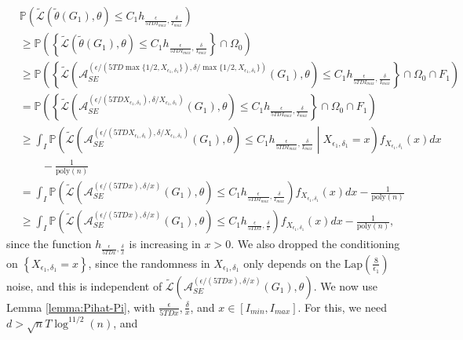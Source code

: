 \documentclass{article}
\begin{document}
\begin{align*}
&\mathbb{P}\left(\widetilde{\mathcal{L}}\left(\widetilde{\theta}(G_1), \theta\right) \leq C_1h_{\frac{\epsilon}{5TDI_{max}}, \frac{\delta}{I_{max}}}\right)\\
&\geq \mathbb{P}\left(\left\{\widetilde{\mathcal{L}}\left(\widetilde{\theta}(G_1), \theta\right) \leq C_1h_{\frac{\epsilon}{5TDI_{max}}, \frac{\delta}{I_{max}}}\right\} \cap \Omega_0\right)\\
&\geq \mathbb{P}\left(\left\{\widetilde{\mathcal{L}}\left(\mathcal{A}_{SE}^{(\epsilon/(5TD\max\{1/2, X_{\epsilon_1, \delta_1}\}), \delta/\max\{1/2, X_{\epsilon_1, \delta_1}\})}(G_1), \theta\right) \leq C_1h_{\frac{\epsilon}{5TDI_{max}}, \frac{\delta}{I_{max}}}\right\} \cap \Omega_0 \cap F_1\right)\\
&= \mathbb{P}\left(\left\{\widetilde{\mathcal{L}}\left(\mathcal{A}_{SE}^{(\epsilon/(5TD X_{\epsilon_1, \delta_1}), \delta/X_{\epsilon_1, \delta_1})}(G_1), \theta\right) \leq C_1h_{\frac{\epsilon}{5TDI_{max}}, \frac{\delta}{I_{max}}}\right\} \cap \Omega_0 \cap F_1\right)\\
&\geq \int_I\mathbb{P}\left(\widetilde{\mathcal{L}}\left(\mathcal{A}_{SE}^{(\epsilon/(5TDX_{\epsilon_1, \delta_1}), \delta/X_{\epsilon_1, \delta_1})}(G_1), \theta\right) \leq C_1h_{\frac{\epsilon}{5TDI_{max}}, \frac{\delta}{I_{max}}}\middle\vert X_{\epsilon_1, \delta_1} = x\right)f_{X_{\epsilon_1, \delta_1}}(x)dx \\
%
& \qquad - \frac{1}{\mathrm{poly}(n)}\\
&= \int_I\mathbb{P}\left(\widetilde{\mathcal{L}}\left(\mathcal{A}_{SE}^{(\epsilon/(5TDx), \delta/x)}(G_1), \theta\right) \leq C_1h_{\frac{\epsilon}{5TDI_{max}}, \frac{\delta}{I_{max}}}\right)f_{X_{\epsilon_1, \delta_1}}(x)dx - \frac{1}{\mathrm{poly}(n)}\\
&\geq \int_I\mathbb{P}\left(\widetilde{\mathcal{L}}\left(\mathcal{A}_{SE}^{(\epsilon/(5TDx), \delta/x)}(G_1), \theta\right) \leq C_1h_{\frac{\epsilon}{5TDx}, \frac{\delta}{x}}\right)f_{X_{\epsilon_1, \delta_1}}(x)dx - \frac{1}{\mathrm{poly}(n)},
\end{align*}
since the function $h_{\frac{\epsilon}{5TDx}, \frac{\delta}{x}}$ is increasing in $x > 0$. We also dropped the conditioning on $\left\{X_{\epsilon_1, \delta_1} = x\right\}$, since the randomness in $X_{\epsilon_1, \delta_1}$ only depends on the $\mathrm{Lap}\left(\frac{8}{\epsilon_1}\right)$ noise, and this is independent of $\widetilde{\mathcal{L}}\left(\mathcal{A}_{SE}^{(\epsilon/(5TDx), \delta/x)}(G_1), \theta\right)$. We now use Lemma \ref{lemma:Pihat-Pi}, with $\frac{\epsilon}{5TDx}, \frac{\delta}{x}$, and $x \in [I_{min}, I_{max}]$. For this, we need $d > \sqrt{n}T\log^{11/2}(n)$, and 
\end{document}
